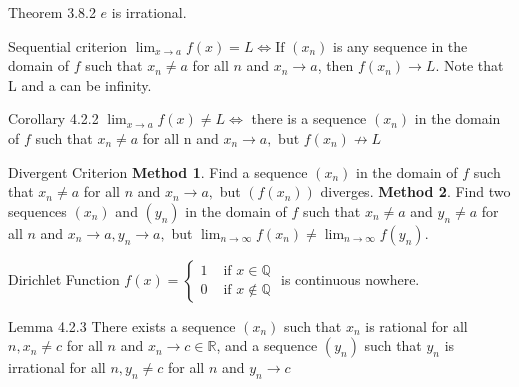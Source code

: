\documentclass[10pt,landscape]{article}
\theoremstyle{definition}
\newcommand{\thistheoremname}{}
\newtheorem*{genericthm*}{\thistheoremname}
\newenvironment{namedthm*}[1]
{\renewcommand{\thistheoremname}{#1}\begin{genericthm*}}
{\end{genericthm*}}
\begin{document}
\begin{multicols}{3}
	\begin{namedthm*}{Theorem 3.8.2}
		\(e\) is irrational.
	\end{namedthm*}

	\begin{namedthm*}{Sequential criterion}
		\(\lim _{x \rightarrow a} f(x)=L \Longleftrightarrow \text{If }\left(x_{n}\right)\) is any sequence in the domain of \(f\) such that \(x_{n} \neq a\) for all \(n\) and \(x_{n} \rightarrow a\), then \(f(x_n)\rightarrow L\). Note that L and a can be infinity.
	\end{namedthm*}

	\begin{namedthm*}{Corollary 4.2.2}
		\(\lim _{x \rightarrow a} f(x) \neq L \Longleftrightarrow\) there is a sequence \(\left(x_{n}\right)\) in the domain of \(f\) such that \(x_{n} \neq a\) for
		all n and \(x_{n} \rightarrow a, \text{ but } f\left(x_{n}\right) \not\rightarrow L\)
	\end{namedthm*}

	\begin{namedthm*}{Divergent Criterion}
		\textbf{Method 1}. Find a sequence \(\left(x_{n}\right)\) in the domain of \(f\) such that \(x_{n} \neq a\) for all \(n\) and \(x_{n} \rightarrow a,\) but \(\left(f\left(x_{n}\right)\right)\) diverges. \textbf{Method 2}. Find two sequences \(\left(x_{n}\right)\) and \(\left(y_{n}\right)\) in the domain of \(f\) such that \(x_{n} \neq a\) and \(y_{n} \neq a\) for all \(n\) and \(x_{n} \rightarrow a, y_{n} \rightarrow a,\) but \(\lim _{n \rightarrow \infty} f\left(x_{n}\right) \neq \lim _{n \rightarrow \infty} f\left(y_{n}\right)\).
	\end{namedthm*}

	\begin{namedthm*}{Dirichlet Function}
		\(f(x)=\left\{\begin{array}{cc}{1} & {\text { if } x \in \mathbb{Q}} \\ {0} & {\text { if } x \notin \mathbb{Q}}\end{array}\right.\) is continuous nowhere.
	\end{namedthm*}

	\begin{namedthm*}{Lemma 4.2.3}
		There exists a sequence \(\left(x_{n}\right)\) such that \(x_{n}\) is rational for all \(n, x_{n} \neq c\) for all \(n\) and \(x_{n} \rightarrow c \in \mathbb{R}\), and a sequence \(\left(y_{n}\right)\) such that \(y_{n}\) is irrational for all \(n, y_{n} \neq c\) for all \(n\) and \(y_{n} \rightarrow c\)
	\end{namedthm*}


\end{multicols}
\end{document}
